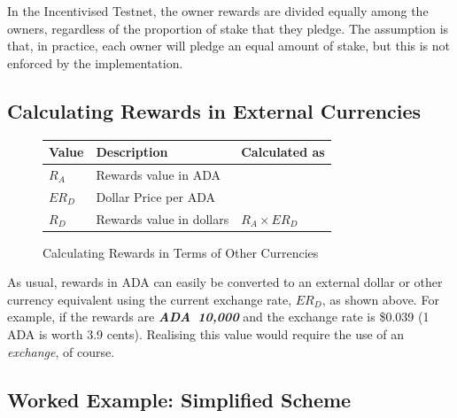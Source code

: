 \documentclass[11pt,a4paper,dvipsnames,twosided,final]{article}
\newcommand{\ada}{ADA{}}
\newcommand{\ADA}[1]{\textbf{\emph{\ada~{#1}}}}
\begin{document}
\noindent
In the Incentivised Testnet, the owner rewards are divided equally among the
owners, regardless of the proportion of stake that they pledge.  The assumption
is that, in practice, each owner will pledge an equal amount of stake, but this
is not enforced by the implementation.

\subsection{Calculating Rewards in External Currencies}
\label{sec:conversion}

\begin{figure}[h!]
\begin{center}
\begin{tabular}{||l|p{6cm}|l||}
  \hline \hline
\textbf{Value} & \textbf{Description} & \textbf{Calculated as} \\\hline
$R_A$ &  Rewards value in \ada{} &\\\hline
$ER_D$ &  Dollar Price per \ada{} &\\\hline
$R_D$ &  Rewards value in dollars & $R_A \times ER_D$ \\\hline
\hline
\end{tabular}
\end{center}
\caption{Calculating Rewards in Terms of Other Currencies}
\label{fig:monetary}
\end{figure}

\noindent
As usual, rewards in \ada{} can easily be converted to an external dollar or other currency equivalent using
the current exchange rate, $ER_D$, as shown %
above.  For example, if the rewards are \ADA{10,000} and the exchange rate is
\$0.039 (1 \ada{} is worth 3.9 cents).  Realising this value would require the use of an \emph{exchange},
of course.

\clearpage
\subsection{Worked Example: Simplified Scheme}
\end{document}
